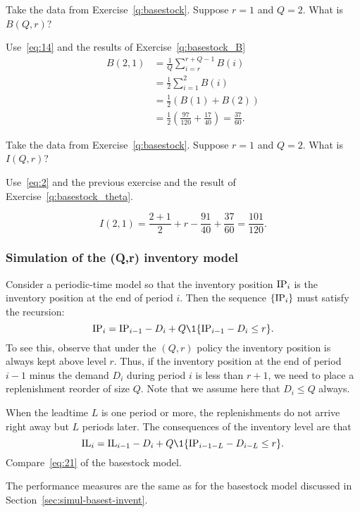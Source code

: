 \begin{question}
  Take the data from Exercise~\ref{q:basestock}. Suppose $r=1$ and $Q=2$. What is $B(Q,r)$?
\end{question}
\begin{solution}
Use~\eqref{eq:14} and the results of Exercise~\ref{q:basestock_B}
  \begin{equation*}
    \begin{split}
      B(2,1)
&= \frac1Q \sum_{i=r}^{r+Q-1} B(i) \\
&= \frac12 \sum_{i=1}^{2} B(i) \\
&= \frac12 (B(1) + B(2)) \\
&= \frac12 \left(\frac{97}{120} + \frac{17}{40}\right) = \frac{37}{60}.
\end{split}
\end{equation*}
\end{solution}


\begin{question}
  Take the data from Exercise~\ref{q:basestock}. Suppose $r=1$ and $Q=2$. What is $I(Q,r)$?
\end{question}
\begin{solution}
  Use~\eqref{eq:2} and the previous exercise and the result of Exercise~\ref{q:basestock_theta}.

  \begin{equation*}
    I(2,1)  = \frac{2+1}2 + r - \frac{91}{40}+ \frac{37}{60} = \frac{101}{120}.
  \end{equation*}
\end{solution}


\subsubsection{Simulation of the (Q,r) inventory model}

Consider a periodic-time model so that the inventory position $\textrm{IP}_i$
is the inventory position at the end of period $i$. Then the sequence
$\{\textrm{IP}_i\}$ must satisfy the recursion:
\begin{equation}
  \IP_i = \IP_{i-1} - D_i + Q \1{\IP_{i-1} - D_i\leq r}.
\end{equation}
To see this, observe that under the $(Q,r)$ policy the inventory
position is always kept above level $r$. Thus, if the inventory
position at the end of period $i-1$ minus the demand $D_i$ during
period $i$ is less than $r+1$, we need to place a replenishment
reorder of size $Q$.  Note that we assume here that $D_i\leq Q$ always.

When the leadtime $L$ is one period or more, the replenishments do not
arrive right away but $L$ periods later. The consequences of the
inventory level are that
\begin{equation}
  \IL_i = \IL_{i-1} - D_i + Q\1{\IP_{i-1-L} - D_{i-L}\leq r}.
\end{equation}
Compare~\eqref{eq:21} of the basestock model.

The performance measures are the same as for the basestock model discussed in Section~\ref{sec:simul-basest-invent}.



